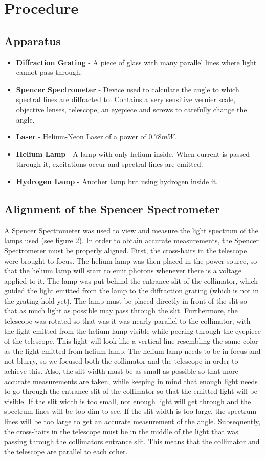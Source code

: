 \documentclass[a4paper]{article}
\begin{document}
\section{Procedure}
\subsection*{Apparatus}
\begin{itemize}
  \item \textbf{Diffraction Grating} - A piece of glass with many parallel lines where light cannot pass through.
  \item \textbf{Spencer Spectrometer} - Device used to calculate the angle to which spectral lines are diffracted to. Contains a very sensitive vernier scale, objective lenses, telescope, an eyepiece and screws to carefully change the angle.
  \item \textbf{Laser} - Helium-Neon Laser of a power of $0.78mW$.
  \item \textbf{Helium Lamp} - A lamp with only helium inside. When current is passed through it, excitations occur and spectral lines are emitted.
  \item \textbf{Hydrogen Lamp} - Another lamp but using hydrogen inside it.
\end{itemize}
\subsection{Alignment of the Spencer Spectrometer}
A Spencer Spectrometer was used to view and measure the light spectrum of the lamps used (see figure 2). In order to obtain accurate measurements, the Spencer Spectrometer must be properly aligned. First, the cross-hairs in the telescope were brought to focus. The helium lamp was then placed in the power source, so that the helium lamp will start to emit photons whenever there is a voltage applied to it. The lamp was put behind the entrance slit of the collimator, which guided the light emitted from the lamp to the diffraction grating (which is not in the grating hold yet). The lamp must be placed directly in front of the slit so that as much light as possible may pass through the slit. Furthermore, the telescope was rotated so that was it was nearly parallel to the collimator, with the light emitted from the helium lamp visible while peering through the eyepiece of the telescope. This light will look like a vertical line resembling the same color as the light emitted from helium lamp. The helium lamp needs to be in focus and not blurry, so we focused both the collimator and the telescope in order to achieve this. Also, the slit width must be as small as possible so that more accurate measurements are taken, while keeping in mind that enough light needs to go through the entrance slit of the collimator so that the emitted light will be visible. If the slit width is too small, not enough light will get through and the spectrum lines will be too dim to see. If the slit width is too large, the spectrum lines will be too large to get an accurate measurement of the angle. Subsequently, the cross-hairs in the telescope must be in the middle of the light that was passing through the collimators entrance slit. This means that the collimator and the telescope are parallel to each other.
\end{document}
